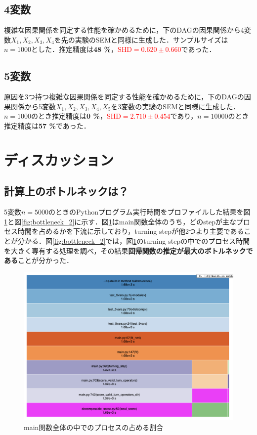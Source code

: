\documentclass[dvipdfmx]{jsarticle}
\newcommand{\red}[1]{\textcolor{red}{#1}}
\begin{document}
\subsection{4変数}
複雑な因果関係を同定する性能を確かめるために，下のDAGの因果関係から4変数$X_1, X_2, X_3, X_4$を先の実験のSEMと同様に生成した．サンプルサイズは$n=1000$とした．推定精度は\textbf{48 \%}，\red{$\text{SHD} = 0.620 \pm 0.660$}であった．


\subsection{5変数}
原因を3つ持つ複雑な因果関係を同定する性能を確かめるために，下のDAGの因果関係から5変数$X_1, X_2, X_3, X_4, X_5$を3変数の実験のSEMと同様に生成した．$n=1000$のとき推定精度は\textbf{0 \%}，\red{$\text{SHD} = 2.710 \pm 0.454$}であり，$n=10000$のとき推定精度は\textbf{57 \%}であった．

\section{ディスカッション}
\subsection{計算上のボトルネックは？}
5変数$n=5000$のときのPythonプログラム実行時間をプロファイルした結果を図\ref{fig:bottleneck_1}と図\ref{fig:bottleneck_2}に示す．図\ref{fig:bottleneck_1}はmain関数全体のうち，どのstepが主なプロセス時間を占めるかを下流に示しており，turning stepが他2つより主要であることが分かる．図\ref{fig:bottleneck_2}では，図\ref{fig:bottleneck_1}のturning stepの中でのプロセス時間を大きく専有する処理を調べ，その結果\textbf{回帰関数の推定が最大のボトルネックである}ことが分かった．

\begin{figure}[t]
 \begin{center}
  \includegraphics[width=0.8\linewidth,angle=0]{images/report1/report1_1.png}
  \caption{main関数全体の中でのプロセスの占める割合 \label{fig:bottleneck_1}}
 \end{center}
\end{figure}
\end{document}

